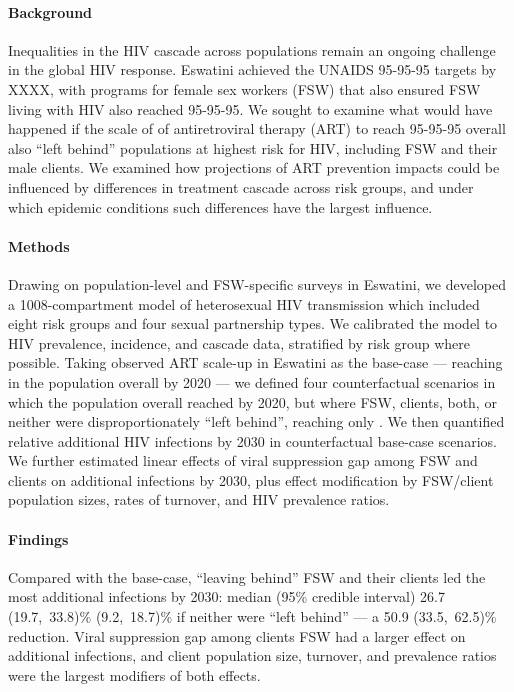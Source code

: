 \paragraph{Background}
Inequalities in the HIV cascade across populations remain an ongoing challenge in the global HIV response. 
Eswatini achieved the UNAIDS 95-95-95 targets by XXXX, with programs for 
female sex workers (FSW) that also ensured FSW living with HIV also reached 95-95-95.
We sought to examine what would have happened if the scale of of 
antiretroviral therapy (ART) to reach 95-95-95 overall also 
``left behind'' populations at highest risk for HIV,
including FSW and their male clients. We examined 
how projections of ART prevention impacts could be influenced by %
differences in treatment cascade across risk groups, and
under which epidemic conditions such differences have the largest influence.
\paragraph{Methods}
Drawing on population-level and FSW-specific surveys in Eswatini,
we developed a 1008-compartment model of heterosexual HIV transmission
which included eight risk groups and four sexual partnership types.
We calibrated the model to HIV prevalence, incidence, and cascade data,
stratified by risk group where possible.
Taking observed ART scale-up in Eswatini as the base-case  %
--- reaching \cashi in the population overall by 2020 ---
we defined four counterfactual scenarios in which
the population overall reached \casmd by 2020,
but where FSW, clients, both, or neither
were disproportionately ``left behind'', reaching only \caslo.
We then quantified relative additional HIV infections by 2030
in counterfactual \vs base-case scenarios.
We further estimated linear effects of
viral suppression gap among FSW and clients on additional infections by 2030, plus
effect modification by FSW/client population sizes, rates of turnover, and HIV prevalence ratios.
\paragraph{Findings}
Compared with the base-case, ``leaving behind'' FSW and their clients
led the most additional infections by 2030: median (95\% credible interval)
26.7 (19.7,~33.8)\%  (9.2,~18.7)\% if neither were ``left behind''
--- a 50.9 (33.5,~62.5)\% reduction.
Viral suppression gap among clients \vs FSW had a larger effect on additional infections, and
client population size, turnover, and prevalence ratios were the largest modifiers of both effects.  %
